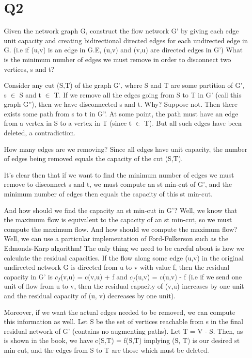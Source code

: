 \documentclass[11pt,a4paper]{article}
\begin{document}
\newpage

\section*{Q2}

Given the network graph G, construct the flow network G' by giving each edge unit capacity and creating bidirectional directed edges for each undirected edge in G. (i.e if (u,v) is an edge in G.E, (u,v) and (v,u) are directed edges in G') What is the minimum number of edges we must remove in order to disconnect two vertices, s and t? 

Consider any cut (S,T) of the graph G', where S and T are some partition of G', s $\in$ S and t $\in$ T. If we remove all the edges going from S to T in G' (call this graph G''), then we have disconnected s and t. Why? Suppose not. Then there exists some path from s to t in G''. At some point, the path must have an edge from a vertex in S to a vertex in T (since t $\in$ T). But all such edges have been deleted, a contradiction.

How many edges are we removing? Since all edges have unit capacity, the number of edges being removed equals the capacity of the cut (S,T). 

It's clear then that if we want to find the minimum number of edges we must remove to disconnect s and t, we must compute an st min-cut of G', and the minimum number of edges then equals the capacity of this st min-cut.

And how should we find the capacity an st min-cut in G'? Well, we know that the maximum flow is equivalent to the capacity of an st min-cut, so we must compute the maximum flow. And how should we compute the maximum flow? Well, we can use a particular implementation of Ford-Fulkerson such as the Edmonds-Karp algorithm! The only thing we need to be careful about is how we calculate the residual capacities. If the flow along some edge (u,v) in the original undirected network G is directed from u to v with value f, then the residual capacity in G' is $c_{f}$(v,u) = c(v,u) + f and $c_{f}$(u,v) = c(u,v) - f (i.e if we send one unit of flow from u to v, then the residual capacity of (v,u) increases by one unit and the residual capacity of (u, v) decreases by one unit).

Moreover, if we want the actual edges needed to be removed, we can compute this information as well. Let S be the set of vertices reachable from s in the final residual network of G' (contains no augmenting paths). Let T = V - S. Then, as is shown in the book, we have c(S,T) = f(S,T) implying (S, T) is our desired st min-cut, and the edges from S to T are those which must be deleted.
\end{document}
